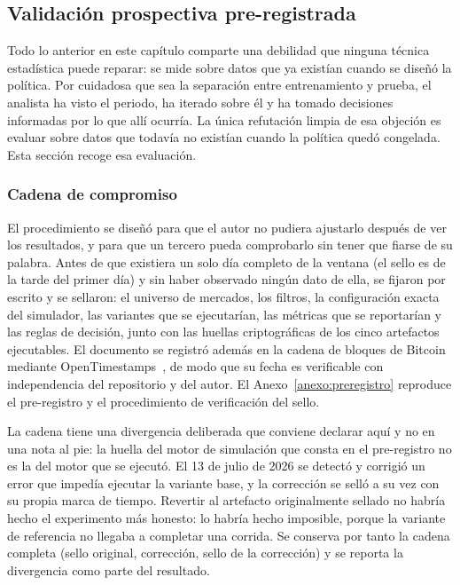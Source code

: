 \subsection{Validación prospectiva pre-registrada}
\label{sec::validacion_prospectiva}

Todo lo anterior en este capítulo comparte una debilidad que ninguna técnica estadística
puede reparar: se mide sobre datos que ya existían cuando se diseñó la política. Por
cuidadosa que sea la separación entre entrenamiento y prueba, el analista ha visto el
periodo, ha iterado sobre él y ha tomado decisiones informadas por lo que allí ocurría. La
única refutación limpia de esa objeción es evaluar sobre datos que todavía no existían
cuando la política quedó congelada. Esta sección recoge esa evaluación.

\subsubsection{Cadena de compromiso}

El procedimiento se diseñó para que el autor no pudiera ajustarlo después de ver los
resultados, y para que un tercero pueda comprobarlo sin tener que fiarse de su palabra.
Antes de que existiera un solo día completo de la ventana (el sello es de la tarde del
primer día) y sin haber observado ningún dato de ella, se fijaron por escrito y se sellaron:
el universo de mercados, los filtros, la configuración exacta del simulador, las variantes
que se ejecutarían, las métricas que se reportarían y las reglas de decisión, junto con
las huellas criptográficas de los cinco artefactos ejecutables. El documento se registró
además en la cadena de bloques de Bitcoin mediante OpenTimestamps~\cite{opentimestamps},
de modo que su fecha es verificable con independencia del repositorio y del autor. El
Anexo~\ref{anexo:preregistro} reproduce el pre-registro y el procedimiento de
verificación del sello.

La cadena tiene una divergencia deliberada que conviene declarar aquí y no en una nota al
pie: la huella del motor de simulación que consta en el pre-registro no es la del motor
que se ejecutó. El 13 de julio de 2026 se detectó y corrigió un error que impedía
ejecutar la variante base, y la corrección se selló a su vez con su propia marca de tiempo.
Revertir al artefacto originalmente sellado no habría hecho el experimento más honesto:
lo habría hecho imposible, porque la variante de referencia no llegaba a completar una
corrida. Se conserva por tanto la cadena completa (sello original, corrección, sello de la
corrección) y se reporta la divergencia como parte del resultado.

